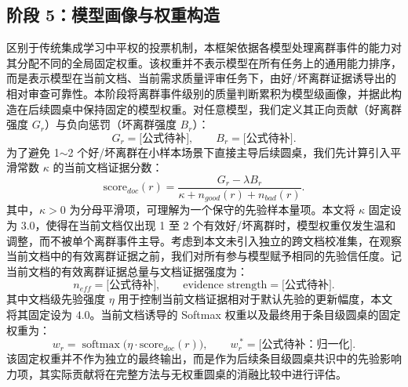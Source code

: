 \documentclass[a4paper,11pt]{ctexart}
\begin{document}
\subsection{阶段 5：模型画像与权重构造}
区别于传统集成学习中平权的投票机制，本框架依据各模型处理离群事件的能力对其分配不同的全局固定权重。该权重并不表示模型在所有任务上的通用能力排序，而是表示模型在当前文档、当前需求质量评审任务下，由好/坏离群证据诱导出的相对审查可靠性。本阶段将离群事件级别的质量判断累积为模型级画像，并据此构造在后续圆桌中保持固定的模型权重。对任意模型，我们定义其正向贡献（好离群强度 $G_r$）与负向惩罚（坏离群强度 $B_r$）：
\begin{equation}
G_r = \text{[公式待补]}, \qquad B_r = \text{[公式待补]}.
\end{equation}
为了避免 1$\sim$2 个好/坏离群在小样本场景下直接主导后续圆桌，我们先计算引入平滑常数 $\kappa$ 的当前文档证据分数：
\begin{equation}
\mathrm{score}_{doc}(r) = \frac{G_r - \lambda B_r}{\kappa + n_{good}(r) + n_{bad}(r)}.
\end{equation}
其中，$\kappa>0$ 为分母平滑项，可理解为一个保守的先验样本量项。本文将 $\kappa$ 固定设为 $3.0$，使得在当前文档仅出现 1 至 2 个有效好/坏离群时，模型权重仅发生温和调整，而不被单个离群事件主导。考虑到本文未引入独立的跨文档校准集，在观察当前文档中的有效离群证据之前，我们对所有参与模型赋予相同的先验信任度。记当前文档的有效离群证据总量与文档证据强度为：
\begin{equation}
n_{eff} = \text{[公式待补]}, \qquad \text{evidence strength} = \text{[公式待补]}.
\end{equation}
其中文档级先验强度 $\eta$ 用于控制当前文档证据相对于默认先验的更新幅度，本文将其固定设为 $4.0$。当前文档诱导的 Softmax 权重以及最终用于条目级圆桌的固定权重为：
\begin{equation}
w_r = \operatorname{softmax}\big(\eta \cdot \mathrm{score}_{doc}(r)\big), \qquad w_r^{\,*} = \text{[公式待补：归一化]}.
\end{equation}
该固定权重并不作为独立的最终输出，而是作为后续条目级圆桌共识中的先验影响力项，其实际贡献将在完整方法与无权重圆桌的消融比较中进行评估。
\end{document}

